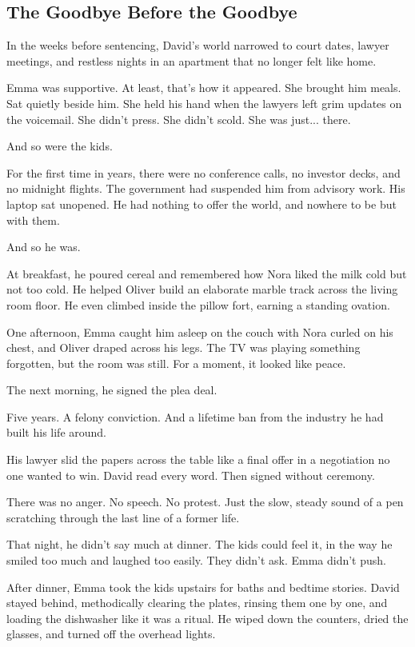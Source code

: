 
\subsection{The Goodbye Before the Goodbye}

In the weeks before sentencing, David’s world narrowed to court dates, lawyer meetings, and restless  
nights in an apartment that no longer felt like home.

Emma was supportive. At least, that’s how it appeared.  
She brought him meals. Sat quietly beside him. She held his hand when the lawyers left grim updates on 
the voicemail.  
She didn’t press. She didn’t scold. She was just... there.

And so were the kids.

For the first time in years, there were no conference calls, no investor decks, and no midnight flights.  
The government had suspended him from advisory work. His laptop sat unopened.  
He had nothing to offer the world, and nowhere to be but with them.

And so he was.

At breakfast, he poured cereal and remembered how Nora liked the milk cold but not too cold.  
He helped Oliver build an elaborate marble track across the living room floor. He even climbed inside 
the pillow fort, earning a standing ovation.

One afternoon, Emma caught him asleep on the couch with Nora curled on his chest, and Oliver draped  
across his legs.  
The TV was playing something forgotten, but the room was still.  
For a moment, it looked like peace.

The next morning, he signed the plea deal.

Five years.  
A felony conviction.  
And a lifetime ban from the industry he had built his life around.

His lawyer slid the papers across the table like a final offer in a negotiation no one wanted to win.  
David read every word. Then signed without ceremony.

There was no anger. No speech. No protest.  
Just the slow, steady sound of a pen scratching through the last line of a former life.

That night, he didn’t say much at dinner.  
The kids could feel it, in the way he smiled too much and laughed too easily.  
They didn’t ask.  
Emma didn’t push.

After dinner, Emma took the kids upstairs for baths and bedtime stories.
David stayed behind, methodically clearing the plates, rinsing them one by one, and loading the 
dishwasher like it was a ritual.
He wiped down the counters, dried the glasses, and turned off the overhead lights.

